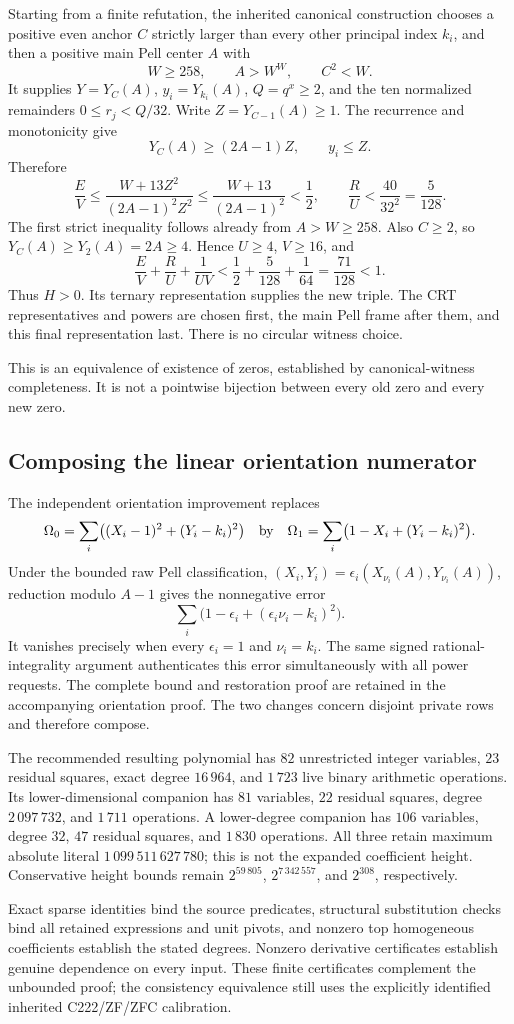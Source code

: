 Starting from a finite refutation, the inherited canonical construction
chooses a positive even anchor $C$ strictly larger than every other
principal index $k_i$, and then a positive main Pell center $A$ with
\[
 W\ge258,\qquad A>W^W,\qquad C^2<W.
\]
It supplies $Y=Y_C(A)$, $y_i=Y_{k_i}(A)$, $Q=q^x\ge2$, and the ten
normalized remainders $0\le r_j<Q/32$. Write $Z=Y_{C-1}(A)\ge1$.
The recurrence and monotonicity give
\[
 Y_C(A)\ge(2A-1)Z,\qquad y_i\le Z.
\]
Therefore
\[
 \frac EV\le\frac{W+13Z^2}{(2A-1)^2Z^2}
 \le\frac{W+13}{(2A-1)^2}<\frac12,
 \qquad \frac RU<\frac{40}{32^2}=\frac5{128}.
\]
The first strict inequality follows already from $A>W\ge258$.
Also $C\ge2$, so $Y_C(A)\ge Y_2(A)=2A\ge4$. Hence $U\ge4$,
$V\ge16$, and
\[
 \frac EV+\frac RU+\frac1{UV}
 <\frac12+\frac5{128}+\frac1{64}
 =\frac{71}{128}<1.
\]
Thus $H>0$. Its ternary representation supplies the new triple. The
CRT representatives and powers are chosen first, the main Pell frame
after them, and this final representation last. There is no circular
witness choice.

This is an equivalence of existence of zeros, established by
canonical-witness completeness. It is not a pointwise bijection between
every old zero and every new zero.

\subsection{Composing the linear orientation numerator}

The independent orientation improvement replaces
\[
 \Omega_0=\sum_i\bigl((X_i-1)^2+(Y_i-k_i)^2\bigr)
 \quad\hbox{by}\quad
 \Omega_1=\sum_i\bigl(1-X_i+(Y_i-k_i)^2\bigr).
\]
Under the bounded raw Pell classification,
$(X_i,Y_i)=\epsilon_i(X_{\nu_i}(A),Y_{\nu_i}(A))$, reduction modulo
$A-1$ gives the nonnegative error
\[
 \sum_i\bigl(1-\epsilon_i+(\epsilon_i\nu_i-k_i)^2\bigr).
\]
It vanishes precisely when every $\epsilon_i=1$ and $\nu_i=k_i$.
The same signed rational-integrality argument authenticates this error
simultaneously with all power requests. The complete bound and
restoration proof are retained in the accompanying orientation proof.
The two changes concern disjoint private rows and therefore compose.

The recommended resulting polynomial has $82$ unrestricted integer
variables, $23$ residual squares, exact degree $16\,964$, and $1\,723$
live binary arithmetic operations. Its lower-dimensional companion has
$81$ variables, $22$ residual squares, degree $2\,097\,732$, and
$1\,711$ operations. A lower-degree companion has $106$ variables,
degree $32$, $47$ residual squares, and $1\,830$ operations. All three
retain maximum absolute literal $1\,099\,511\,627\,780$; this is not
the expanded coefficient height. Conservative height bounds remain
$2^{59\,805}$, $2^{7\,342\,557}$, and $2^{308}$, respectively.

Exact sparse identities bind the source predicates, structural
substitution checks bind all retained expressions and unit pivots, and
nonzero top homogeneous coefficients establish the stated degrees.
Nonzero derivative certificates establish genuine dependence on every
input. These finite certificates complement the unbounded proof; the
consistency equivalence still uses the explicitly identified inherited
C222/ZF/ZFC calibration.
